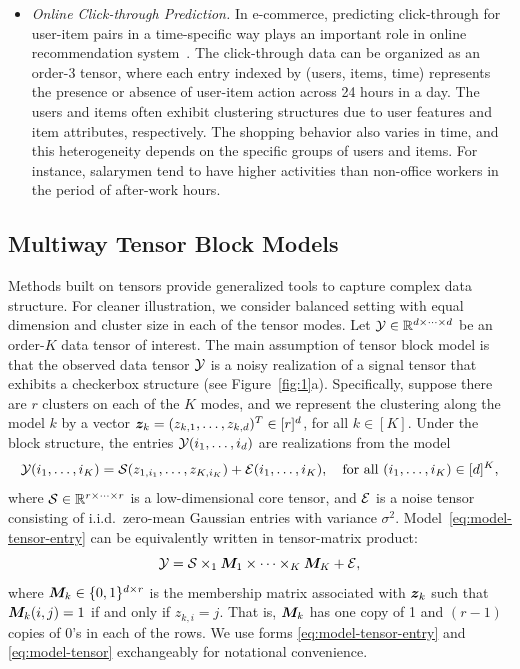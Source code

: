 \documentclass[11pt]{article}
\theoremstyle{exampstyle}
\theoremstyle{definition}
\begin{document}
\begin{itemize}[wide, labelwidth=!, labelindent=0pt,topsep=-7pt]
\item \emph{Online Click-through Prediction.} In e-commerce, predicting click-through for user-item pairs in a time-specific way plays an important role in online recommendation system~\cite{sun2015provable}. The click-through data can be organized as an order-3 tensor, where each entry indexed by (users, items, time) represents the presence or absence of user-item action across 24 hours in a day. The users and items often exhibit clustering structures due to user features and item attributes, respectively. The shopping behavior also varies in time, and this heterogeneity depends on the specific groups of users and items. For instance, salarymen tend to have higher activities than non-office workers in the period of after-work hours. 
\end{itemize}


\subsection{Multiway Tensor Block Models}
\vspace{-.2cm}
Methods built on tensors provide generalized tools to capture complex data structure. For cleaner illustration, we consider balanced setting with equal dimension and cluster size in each of the tensor modes. Let $\mathcal{Y}\in\mathbb{R}^{d\times \cdots \times d}$ be an order-$K$ data tensor of interest. The main assumption of tensor block model is that the observed data tensor $\mathcal{Y}$ is a noisy realization of a signal tensor that exhibits a checkerbox structure (see Figure~\ref{fig:1}a). Specifically, suppose there are $r$ clusters on each of the $K$ modes, and we represent the clustering along the model $k$ by a vector $\bm{z}_k =(z_{k,1},\ldots, z_{k,d})^T\in [r]^{d}$, for all $k\in[K]$. Under the block structure, the entries $\mathcal{Y}(i_1,\ldots,i_d)$ are realizations from the model
\begin{equation}\label{eq:model-tensor-entry}
\mathcal{Y}(i_1,\ldots,i_K)=\mathcal{S}(z_{1,i_1},\ldots,z_{K,i_K})+\mathcal{E}(i_1,\ldots,i_K),\quad \text{for all } (i_1,\ldots,i_K)\in[d]^K,
\end{equation}
where $\mathcal{S}\in\mathbb{R}^{r\times \cdots\times r}$ is a low-dimensional core tensor, and $\mathcal{E}$ is a noise tensor consisting of i.i.d.\ zero-mean Gaussian entries with variance $\sigma^2$. Model~\eqref{eq:model-tensor-entry} can be equivalently written in tensor-matrix product: 
\begin{equation}\label{eq:model-tensor}
\mathcal{Y} = \mathcal{S} \times_1 \bm M_1 \times \cdots \times_K \bm M_K + \mathcal{E},
\end{equation}
where $\bm M_k \in \{0,1\}^{d\times r}$ is the membership matrix associated with $\bm{z}_k$ such that $\bm M_k(i,j) = 1$ if and only if $z_{k,i} = j$. That is, $\bm M_k$ has one copy of 1 and $(r-1)$ copies of 0's in each of the rows. We use forms \eqref{eq:model-tensor-entry} and \eqref{eq:model-tensor} exchangeably for notational convenience. 
\end{document}
